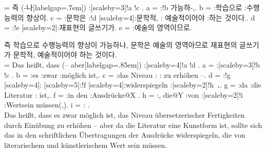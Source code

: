 \documentclass{article}  %
\begin{document}
\begin{CJK}{UTF8}{mj}
\vspace*{-3cm}

\begin{center}
\jtree[xunit=2em,yunit=1.5em]
\! = {즉} ({-나}[labelgap=.7em]) :[scaleby=3]!a !c .
\!a = :!b {가능하-,}.
\!b = :{학습으로} :{수행능력의\qquad} {향상이}.
\!c = :{문학은} :!d [scaleby=4]:{문학적,} :{ 예술적이어야 \quad} :{하는} {것이다.}.
\!d = :!e [scaleby=2]:{재표현의\qquad\quad} {글쓰기가}.
\!e = :{예술의\quad} {영역이므로}.
\endjtree\\[1em]
\end{center}

\noindent  즉 학습으로 수행능력의 향상이 가능하나,  문학은 예술의 영역아므로 재표현의 글쓰기가 문학적, 예술적이어야 하는 것이다.\\[3em]
\small
\hspace*{-3.35em}
\jtree[xunit=2em,yunit=1.5em]
\! = {Das heißt, dass} ({-- aber}[labelgap=.85em]) :[scaleby=4]!a !d .
\!a = :[scaleby=3]!b !c .
\!b = :{es} :{zwar} :{möglich} {ist,}.
\!c = :{das Niveau\qquad} :{\qquad\qquad} :{} {\qquad\quad zu erhöhen --}.
\!d = :!g [scaleby=4]:{} [scaleby=5]:!f [scaleby=4]:{widerspiegeln\qquad} :[scaleby=2]!h {\qquad\,\textbf{.}}.
\!g = :{da} :{die Literatur\qquad} :{\quad{}} {ist,}.
\!f = :{in den\qquad} :{\qquad\qquad}{\qquad\quad Ausdrücke}@X .
\!h = :{, die\quad}@Y :{von} :[scaleby=2]!i :{Wert\quad}{\quad sein müssen(,)}.
\!i = :{\qquad} {}.
\endjtree\\[1em]

\normalsize\noindent
Das heißt, dass es zwar möglich ist, das Niveau übersetzerischer Fertigkeiten durch Einübung zu erhöhen -- aber da die Literatur eine Kunstform ist, sollte sich das in den schriftlichen Übertragungen der Ausdrücke widerspiegeln, die von literarischem und künstlerischem Wert sein müssen.

\end{CJK}
\end{document}

